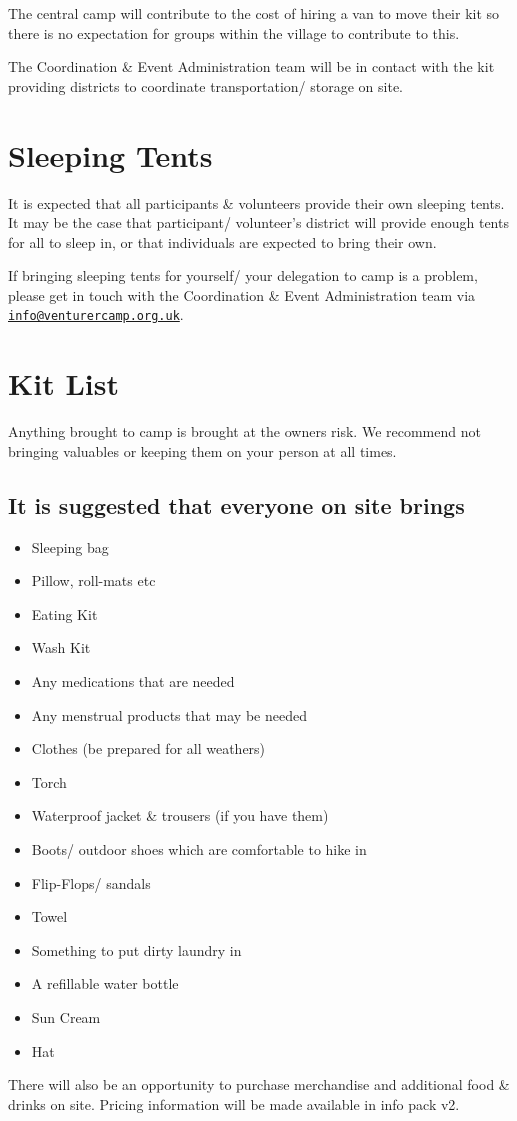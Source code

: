\documentclass[a4paper, 11pt]{report}
\newcommand{\nl}{\newline}
\begin{document}
The central camp will contribute to the cost of hiring a van to move their kit so there is no expectation for groups within the village to contribute to this.\nl

The Coordination \& Event Administration team will be in contact with the kit providing districts to coordinate transportation/ storage on site.

\section{Sleeping Tents}
It is expected that all participants \& volunteers provide their own sleeping tents. It may be the case that participant/ volunteer's district will provide enough tents for all to sleep in, or that individuals are expected to bring their own.\nl

If bringing sleeping tents for yourself/ your delegation to camp is a problem, please get in touch with the Coordination \& Event Administration team via \href{mailto:info@venturercamp.org.uk}{\texttt{info@venturercamp.org.uk}}.

\section{Kit List}
Anything brought to camp is brought at the owners risk. We recommend not bringing valuables or keeping them on your person at all times.
\subsection{It is suggested that everyone on site brings}
\begin{itemize}
    \item Sleeping bag
    \item Pillow, roll-mats etc
    \item Eating Kit
    \item Wash Kit
    \item Any medications that are needed
    \item Any menstrual products that may be needed
    \item Clothes (be prepared for all weathers)
    \item Torch
    \item Waterproof jacket \& trousers (if you have them)
    \item Boots/ outdoor shoes which are comfortable to hike in
    \item Flip-Flops/ sandals
    \item Towel
    \item Something to put dirty laundry in
    \item A refillable water bottle
    \item Sun Cream
    \item Hat
\end{itemize}
There will also be an opportunity to purchase merchandise and additional food \& drinks on site. Pricing information will be made available in info pack v2.  
\end{document}
